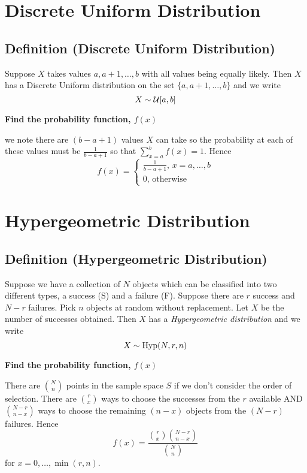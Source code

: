 \section{Discrete Uniform Distribution}
\begin{defbox}
    \subsection{Definition (Discrete Uniform Distribution)}
    Suppose $ X $ takes values $ a,a+1,\ldots ,b $ with all values
    being equally likely. Then $ X $ has a Discrete Uniform distribution
    on the set $ \{a,a+1,\ldots ,b\} $ and we write
    \[ X \sim \operatorname{\mathcal{U}}[a,b] \]
\end{defbox}

\textbf{Find the probability function, $ f(x)$}

we note there are $ (b-a+1) $ values $ X $ can take so the probability
at each of these values must be $ \frac{1}{b-a+1} $ so that
$ \sum\limits_{x=a}^{b} f(x)=1 $. Hence
\[ f(x)=
    \begin{cases}
        \frac{1}{b-a+1},\,x=a,\ldots,b \\
        0,\,\text{otherwise}
    \end{cases} \]

\section{Hypergeometric Distribution}
\begin{defbox}
    \subsection{Definition (Hypergeometric Distribution)}
    Suppose we have a collection of $ N $ objects which can be
    classified into two different types, a success (S) and a failure (F).
    Suppose there are $ r $ success and $ N-r $ failures. Pick $ n $
    objects at random without replacement. Let $ X $ be the number of successes
    obtained. Then $ X $ has a \emph{Hypergeometric distribution} and we write
    \[ X \sim \operatorname{Hyp}(N,r,n) \]
\end{defbox}

\textbf{Find the probability function, $ f(x)$}

There are $ \binom{N}{n} $ points in the sample space $ S $ if we don't
consider the order of selection. There are $ \binom{r}{x} $ ways to choose
the successes from the $ r $ available AND $ \binom{N-r}{n-x} $ ways to choose
the remaining $ (n-x) $ objects from the $ (N-r) $ failures. Hence
\[ f(x)=\frac{\binom{r}{x}\binom{N-r}{n-x}}{\binom{N}{n}} \]
for $ x=0,\ldots ,\min(r,n) $.

